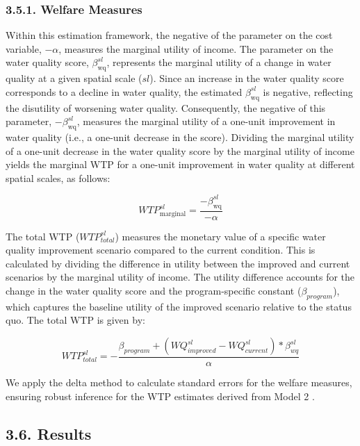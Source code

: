 \documentclass[12pt]{article}
\begin{document}
\subsubsection*{3.5.1. Welfare Measures}

Within this estimation framework, the negative of the parameter on the cost variable, $-\alpha$, measures the marginal utility of income. 
The parameter on the water quality score, $\beta^{sl}_{\text{wq}}$, represents the marginal utility of a change in water quality at a given 
spatial scale ($sl$). Since an increase in the water quality score corresponds to a decline in water quality, the estimated 
$\beta^{sl}_{\text{wq}}$ is negative, reflecting the disutility of worsening water quality. 
Consequently, the negative of this parameter, $-\beta^{sl}_{\text{wq}}$, measures the marginal utility of a one-unit improvement in water 
quality (i.e., a one-unit decrease in the score). Dividing the marginal utility of a one-unit decrease in the water quality score by the 
marginal utility of income yields the marginal WTP for a one-unit improvement in water quality at different spatial 
scales, as follows:


\begin{equation}
    WTP^{sl}_{\text{marginal}} = \frac{-\beta^{sl}_{\text{wq}}}{-\alpha}
\end{equation}

\noindent The total WTP ($WTP^{sl}_{total}$) measures the monetary value of a specific water quality improvement scenario compared to 
the current condition. This is calculated by dividing the difference in utility between the improved and current scenarios by the marginal utility of income. 
The utility difference accounts for the change in the water quality score and the program-specific constant ($\beta_{{program}}$), 
which captures the baseline utility of the improved scenario relative to the status quo. The 
total WTP is given by:

\begin{equation}
    WTP^{sl}_{total} = -\frac{\beta_{program}+(WQ^{sl}_{improved}-WQ^{sl}_{current})*\beta^{sl}_{wq}}{\alpha}
\end{equation}

\noindent We apply the delta method to calculate standard errors for the welfare measures, ensuring robust inference for the WTP estimates derived 
from Model 2 \parencite{train2009discrete}.


\subsection*{3.6. Results}
\end{document}
